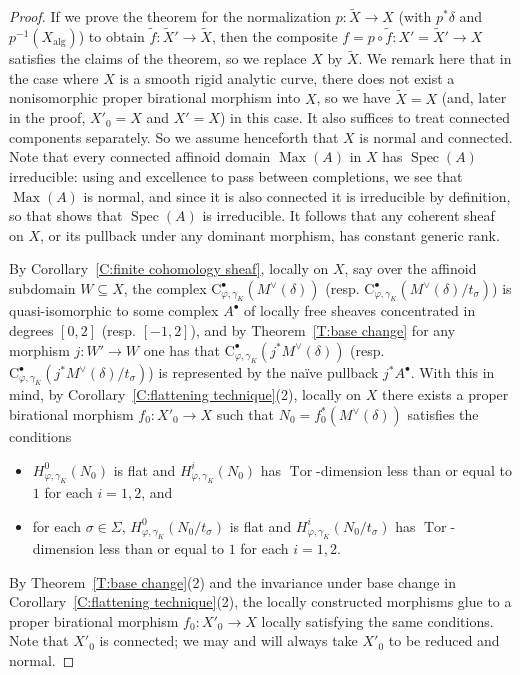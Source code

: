 \documentclass[12pt]{article}
\theoremstyle{definition}
\numberwithin{equation}{theorem}
\newcommand{\rmC}{\mathrm{C}}
\newcommand{\alg}{\mathrm{alg}}
\DeclareMathOperator{\Max}{Max}
\DeclareMathOperator{\Spec}{Spec}
\DeclareMathOperator{\Tor}{Tor}
\begin{document}
\begin{proof}
If we prove the theorem for the normalization $p: \widetilde{X} \to X$
(with $p^*\delta$ and $p^{-1}(X_\alg)$) to obtain $\widetilde{f}:
\widetilde{X}' \to \widetilde{X}$, then the composite $f = p \circ
\widetilde{f}: X' = \widetilde{X}' \to X$ satisfies the claims of the
theorem, so we replace $X$ by $\widetilde{X}$.  We remark here that in
the case where $X$ is a smooth rigid analytic curve, there does not
exist a nonisomorphic proper birational morphism into $X$, so we have
$\widetilde{X} = X$ (and, later in the proof, $X'_0 = X$ and $X' = X$)
in this case.  It also suffices to treat connected components
separately.  So we assume henceforth that $X$ is normal and connected.
Note that every connected affinoid domain $\Max(A)$ in $X$ has
$\Spec(A)$ irreducible: using \cite[Lemma~2.1.1]{conrad} and
excellence to pass between completions, we see that $\Max(A)$ is
normal, and since it is also connected it is irreducible by
definition, so that \cite[Lemma~2.1.4]{conrad} shows that $\Spec(A)$
is irreducible.  It follows that any coherent sheaf on $X$, or its
pullback under any dominant morphism, has constant generic rank.

By Corollary~\ref{C:finite cohomology sheaf}, locally on $X$, say over
the affinoid subdomain $W \subseteq X$, the complex
$\rmC_{\varphi,\gamma_K}^\bullet(M^\vee(\delta))$
(resp. $\rmC_{\varphi,\gamma_K}^\bullet(M^\vee(\delta)/t_\sigma)$) is
quasi-isomorphic to some complex $A^\bullet$ of locally free sheaves
concentrated in degrees $[0,2]$ (resp. $[-1,2]$), and by
Theorem~\ref{T:base change} for any morphism $j: W' \to W$ one has
that $\rmC_{\varphi,\gamma_K}^\bullet(j^*M^\vee(\delta))$
(resp.\ $\rmC_{\varphi,\gamma_K}^\bullet(j^*M^\vee(\delta)/t_\sigma)$)
is represented by the na\"ive pullback $j^*A^\bullet$.  With this in
mind, by Corollary~\ref{C:flattening technique}(2), locally on $X$
there exists a proper birational morphism $f_0: X'_0 \to X$ such that
$N_0 = f_0^*(M^\vee(\delta))$ satisfies the conditions
\begin{itemize}
\item[(i)] $H^0_{\varphi, \gamma_K}(N_0)$ is flat and $H^i_{\varphi, \gamma_K}(N_0)$ has $\Tor$-dimension less than or equal to $1$ for each $i =1, 2$, and
\item[(ii)] for each $\sigma \in \Sigma$, $H^0_{\varphi, \gamma_K}(N_0/t_\sigma)$ is flat and $H^i_{\varphi, \gamma_K}(N_0/ t_\sigma)$ has $\Tor$-dimension less than or equal to $1$ for each $i=1,2$.
\end{itemize}
By Theorem~\ref{T:base change}(2) and the invariance under base change in Corollary~\ref{C:flattening technique}(2), the locally constructed morphisms glue to a proper birational morphism $f_0: X'_0 \to X$ locally satisfying the same conditions.
Note that $X'_0$ is connected; we may and will always take $X'_0$ to
be reduced and normal.


\end{proof}
\end{document}
